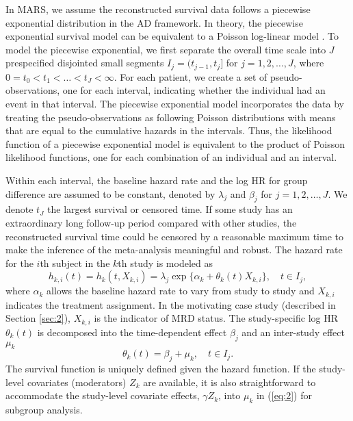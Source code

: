 \documentclass[12pt]{article}
\theoremstyle{mystyle}
\begin{document}
In MARS, we assume the reconstructed survival data follows a piecewise exponential distribution in the AD framework.  In theory, the piecewise exponential survival model can be equivalent to a Poisson log-linear model \citep{Holford1980, Laird1981}. To model the piecewise exponential, we first separate the overall time scale into $J$ prespecified disjointed small segments $I_j=(t_{j-1},t_j]$ for $j=1,2,\dots,J$, where $0=t_0<t_1<\dots<t_J<\infty$. For each patient, we create a set of pseudo-observations, one for each interval, indicating whether the individual had an event in that interval. The piecewise exponential model incorporates the data by treating the pseudo-observations as following Poisson distributions with means that are equal to the cumulative hazards in the intervals. Thus, the likelihood function of a piecewise exponential model is equivalent to the product of Poisson likelihood functions, one for each combination of an individual and an interval. 

Within each interval, the baseline hazard rate and the log HR for group difference are assumed to be constant, denoted by $\lambda_j$ and $\beta_j$ for $j=1,2,\dots,J$. We denote $t_J$ the largest survival or censored time. If some study has an extraordinary long follow-up period compared with other studies, the reconstructed survival time could be censored by a reasonable maximum time to make the inference of the meta-analysis meaningful and robust. 
The hazard rate for the $i$th subject in the $k$th study is modeled as
\begin{equation}\label{eq:1}
h_{k,i}(t)=h_{k}(t, X_{k,i})=\lambda_j\exp{\{\alpha_k+\theta_k(t)X_{k,i}\}},\quad t\in I_j,
\end{equation}
where $\alpha_k$ allows the baseline hazard rate to vary from study to study and $X_{k,i}$ indicates the treatment assignment. In the motivating case study (described in Section \ref{sec:2}), $X_{k,i}$ is the indicator of MRD status.
The study-specific log HR $\theta_k(t)$ is decomposed into the time-dependent effect $\beta_j$ and an inter-study effect $\mu_k$
\begin{equation}\label{eq:2}
\theta_k(t)=\beta_j+\mu_k,  \quad t\in I_j.
\end{equation}
The survival function is uniquely defined given the hazard function. If the study-level covariates (moderators) $Z_k$ are available, it is also straightforward to accommodate the study-level covariate effects, $\gamma Z_k$, into $\mu_k$ in (\ref{eq:2}) for subgroup analysis.
\end{document}
